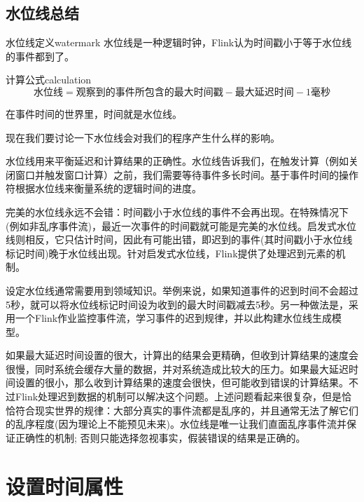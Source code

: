 \documentclass[cn,11pt,chinese]{elegantbook}
\begin{document}
\subsection{水位线总结}

\begin{definition}{水位线定义}{watermark}
    水位线是一种逻辑时钟，Flink认为时间戳小于等于水位线的事件都到了。
\end{definition}

\begin{definition}{计算公式}{calculation}
    \begin{equation}
        \text{水位线} = \text{观察到的事件所包含的最大时间戳} - \text{最大延迟时间} - \text{1毫秒}
    \end{equation}
\end{definition}

\begin{note}
    在事件时间的世界里，时间就是水位线。
\end{note}

现在我们要讨论一下水位线会对我们的程序产生什么样的影响。

水位线用来平衡延迟和计算结果的正确性。水位线告诉我们，在触发计算（例如关闭窗口并触发窗口计算）之前，我们需要等待事件多长时间。基于事件时间的操作符根据水位线来衡量系统的逻辑时间的进度。

完美的水位线永远不会错：时间戳小于水位线的事件不会再出现。在特殊情况下(例如非乱序事件流)，最近一次事件的时间戳就可能是完美的水位线。启发式水位线则相反，它只估计时间，因此有可能出错，即迟到的事件(其时间戳小于水位线标记时间)晚于水位线出现。针对启发式水位线，Flink提供了处理迟到元素的机制。

设定水位线通常需要用到领域知识。举例来说，如果知道事件的迟到时间不会超过5秒，就可以将水位线标记时间设为收到的最大时间戳减去5秒。另一种做法是，采用一个Flink作业监控事件流，学习事件的迟到规律，并以此构建水位线生成模型。

如果最大延迟时间设置的很大，计算出的结果会更精确，但收到计算结果的速度会很慢，同时系统会缓存大量的数据，并对系统造成比较大的压力。如果最大延迟时间设置的很小，那么收到计算结果的速度会很快，但可能收到错误的计算结果。不过Flink处理迟到数据的机制可以解决这个问题。上述问题看起来很复杂，但是恰恰符合现实世界的规律：大部分真实的事件流都是乱序的，并且通常无法了解它们的乱序程度(因为理论上不能预见未来)。水位线是唯一让我们直面乱序事件流并保证正确性的机制; 否则只能选择忽视事实，假装错误的结果是正确的。

\section{设置时间属性}
\end{document}
